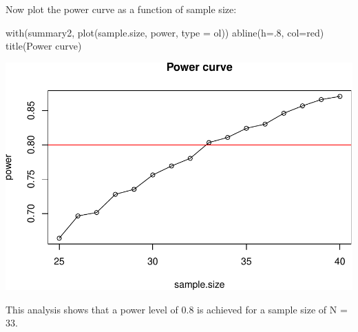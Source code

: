 \documentclass[
]{article}
\newenvironment{Shaded}{\begin{snugshade}}{\end{snugshade}}
\newcommand{\AttributeTok}[1]{\textcolor[rgb]{0.77,0.63,0.00}{#1}}
\newcommand{\DecValTok}[1]{\textcolor[rgb]{0.00,0.00,0.81}{#1}}
\newcommand{\FunctionTok}[1]{\textcolor[rgb]{0.00,0.00,0.00}{#1}}
\newcommand{\NormalTok}[1]{#1}
\newcommand{\StringTok}[1]{\textcolor[rgb]{0.31,0.60,0.02}{#1}}
\begin{document}
Now plot the power curve as a function of sample size:

\begin{Shaded}
\begin{Highlighting}[]
\FunctionTok{with}\NormalTok{(summary2, }\FunctionTok{plot}\NormalTok{(sample.size, power, }\AttributeTok{type =} \StringTok{\textquotesingle{}ol\textquotesingle{}}\NormalTok{)) }
\FunctionTok{abline}\NormalTok{(}\AttributeTok{h=}\NormalTok{.}\DecValTok{8}\NormalTok{, }\AttributeTok{col=}\StringTok{\textquotesingle{}red\textquotesingle{}}\NormalTok{)}
\FunctionTok{title}\NormalTok{(}\StringTok{\textquotesingle{}Power curve\textquotesingle{}}\NormalTok{)}
\end{Highlighting}
\end{Shaded}

\includegraphics{power_analysis-0-5_files/figure-latex/unnamed-chunk-3-1.pdf}

This analysis shows that a power level of 0.8 is achieved for a sample
size of N = 33.
\end{document}
